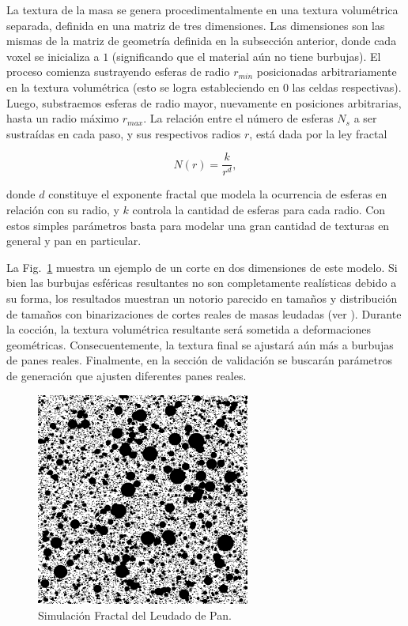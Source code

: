 La textura de la masa se genera procedimentalmente en una textura volumétrica separada, definida en una matriz de tres dimensiones.
Las dimensiones son las mismas de la matriz de geometría definida en la subsección anterior, donde cada voxel se inicializa a $1$ (significando que el material aún no tiene burbujas).
El proceso comienza sustrayendo esferas de radio $r_{min}$ posicionadas arbitrariamente en la textura volumétrica (esto se logra estableciendo en $0$ las celdas respectivas).
Luego, substraemos esferas de radio mayor, nuevamente en posiciones arbitrarias, hasta un radio máximo $r_{max}$.
La relación entre el número de esferas $N_{s}$ a ser sustraídas en cada paso, y sus respectivos radios $r$, está dada por la ley fractal


\begin{equation*}
N(r) = \frac{k}{r^{d}},
\end{equation*}

\noindent donde $d$ constituye el exponente fractal que modela la ocurrencia de esferas en relación con su radio, y $k$ controla la cantidad de esferas para cada radio.
Con estos simples parámetros basta para modelar una gran cantidad de texturas en general y pan en particular.

La Fig.~\ref{FigProving} muestra un ejemplo de un corte en dos dimensiones de este modelo.
Si bien las burbujas esféricas resultantes no son completamente realísticas debido a su forma, los resultados muestran un notorio parecido en tamaños y distribución de tamaños con binarizaciones de cortes reales de masas leudadas (ver \cite{Babin2006}).
Durante la cocción, la textura volumétrica resultante será sometida a deformaciones geométricas. Consecuentemente, la textura final se ajustará aún más a burbujas de panes reales.
Finalmente, en la sección de validación se buscarán parámetros de generación que ajusten diferentes panes reales. 

\begin{figure}
\center
\includegraphics[width=7cm]{figures/bubbles}
\caption{Simulación Fractal del Leudado de Pan.}
\label{FigProving}
\end{figure}


